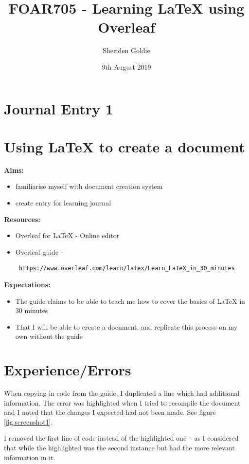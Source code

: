 \documentclass{article}
\title{FOAR705 - Learning LaTeX using Overleaf}
\author{Sheriden Goldie}
\date{9th August 2019}
\begin{document}
\maketitle
\section*{Journal Entry 1}
\section*{Using LaTeX to create a document}

\textbf{Aims:}
\begin{itemize}
    \item familiarise myself with document creation system
    \item create entry for learning journal
    \end{itemize}

\noindent \textbf{Resources:}
\begin{itemize}
    \item Overleaf for LaTeX - Online editor
    \item Overleaf guide - \begin{verbatim} https://www.overleaf.com/learn/latex/Learn_LaTeX_in_30_minutes \end{verbatim}
    \end{itemize}

\noindent \textbf{Expectations:}
\begin{itemize}
    \item The guide claims to be able to teach me how to cover the basics of LaTeX in 30 minutes
    \item That I will be able to create a document, and replicate this process on my own without the guide
\end{itemize}


\section*{Experience/Errors}

When copying in code from the guide, I duplicated a line which had additional information. The error was highlighted when I tried to recompile the document and I noted that the changes I expected had not been made.
See figure \ref{fig:screenshot1}.

I removed the first line of code instead of the highlighted one – as I considered that while the highlighted was the second instance but had the more relevant information in it.
\end{document}
